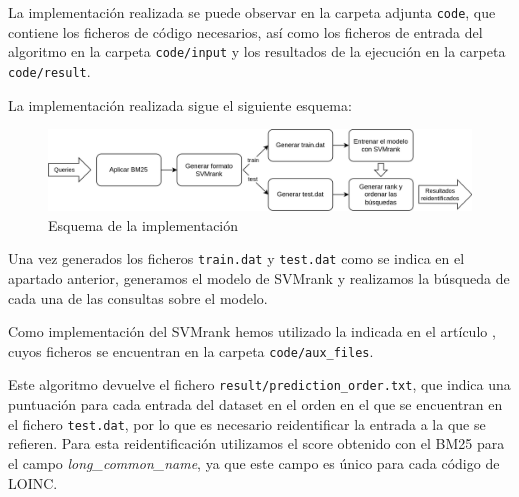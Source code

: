 \documentclass[a4paper,12pt]{article}
\begin{document}
	La implementación realizada se puede observar en la carpeta adjunta \texttt{code}, que contiene los ficheros de código necesarios, así como los ficheros de entrada del algoritmo en la carpeta \texttt{code/input} y los resultados de la ejecución en la carpeta \texttt{code/result}.
	
	La implementación realizada sigue el siguiente esquema:
	
	\begin{figure}[H]
		\centering
		\includegraphics[width=\textwidth]{include/esquema_implementacion.png}
		\caption{Esquema de la implementación}
	\end{figure}
	
	Una vez generados los ficheros \texttt{train.dat} y \texttt{test.dat} como se indica en el apartado anterior, generamos el modelo de SVMrank y realizamos la búsqueda de cada una de las consultas sobre el modelo. 
	
	Como implementación del SVMrank hemos utilizado la indicada en el artículo \cite{articulo-clase}, cuyos ficheros se encuentran en la carpeta \texttt{code/aux\_files}.
	
	Este algoritmo devuelve el fichero \texttt{result/prediction\_order.txt}, que indica una puntuación para cada entrada del dataset en el orden en el que se encuentran en el fichero \texttt{test.dat}, por lo que es necesario reidentificar la entrada a la que se refieren. Para esta reidentificación utilizamos el score obtenido con el BM25 para el campo \textit{long\_common\_name}, ya que este campo es único para cada código de LOINC.
	
\end{document}
